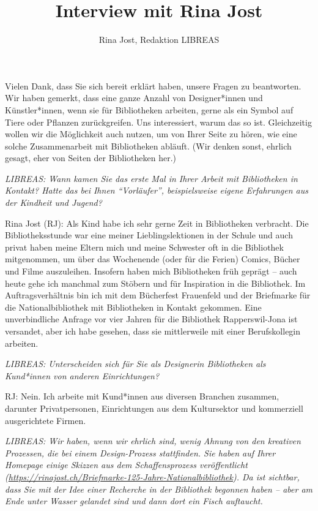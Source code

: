 \documentclass[a4paper,
fontsize=11pt,
oneside,
numbers=noperiodatend,
parskip=half-,
bibliography=totoc,
final
]{scrartcl}
\title{\LARGE{Interview mit Rina Jost}}%
\author{Rina Jost, Redaktion LIBREAS} %
\date{}
\begin{document}
\maketitle
\thispagestyle{fancyplain} 


Vielen Dank, dass Sie sich bereit erklärt haben, unsere Fragen zu
beantworten. Wir haben gemerkt, dass eine ganze Anzahl von
Designer*innen und Künstler*innen, wenn sie für Bibliotheken arbeiten,
gerne als ein Symbol auf Tiere oder Pflanzen zurückgreifen. Uns
interessiert, warum das so ist. Gleichzeitig wollen wir die Möglichkeit
auch nutzen, um von Ihrer Seite zu hören, wie eine solche Zusammenarbeit
mit Bibliotheken abläuft. (Wir denken sonst, ehrlich gesagt, eher von
Seiten der Bibliotheken her.)

\emph{LIBREAS: Wann kamen Sie das erste Mal in Ihrer Arbeit mit
Bibliotheken in Kontakt? Hatte das bei Ihnen \enquote{Vorläufer},
beispielsweise eigene Erfahrungen aus der Kindheit und Jugend?}

Rina Jost (RJ): Als Kind habe ich sehr gerne Zeit in Bibliotheken
verbracht. Die Bibliotheksstunde war eine meiner Lieblingslektionen in
der Schule und auch privat haben meine Eltern mich und meine Schwester
oft in die Bibliothek mitgenommen, um über das Wochenende (oder für die
Ferien) Comics, Bücher und Filme auszuleihen. Insofern haben mich
Bibliotheken früh geprägt -- auch heute gehe ich manchmal zum Stöbern
und für Inspiration in die Bibliothek. Im Auftragsverhältnis bin ich mit
dem Bücherfest Frauenfeld und der Briefmarke für die Nationalbibliothek
mit Bibliotheken in Kontakt gekommen. Eine unverbindliche Anfrage vor
vier Jahren für die Bibliothek Rapperswil-Jona ist versandet, aber ich
habe gesehen, dass sie mittlerweile mit einer Berufskollegin arbeiten.

\emph{LIBREAS: Unterscheiden sich für Sie als Designerin Bibliotheken
als Kund*innen von anderen Einrichtungen?}

RJ: Nein. Ich arbeite mit Kund*innen aus diversen Branchen zusammen,
darunter Privatpersonen, Einrichtungen aus dem Kultursektor und
kommerziell ausgerichtete Firmen.

\emph{LIBREAS: Wir haben, wenn wir ehrlich sind, wenig Ahnung von den
kreativen Prozessen, die bei einem Design-Prozess stattfinden. Sie haben
auf Ihrer Homepage einige Skizzen aus dem Schaffensprozess
veröffentlicht
(\url{https://rinajost.ch/Briefmarke-125-Jahre-Nationalbibliothek}). Da
ist sichtbar, dass Sie mit der Idee einer Recherche in der Bibliothek
begonnen haben -- aber am Ende unter Wasser gelandet sind und dann dort
ein Fisch auftaucht.}
\end{document}
